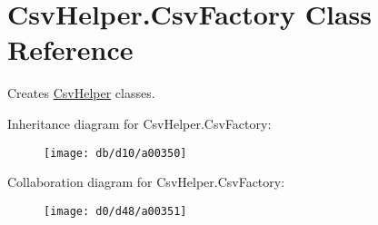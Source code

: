\hypertarget{a00045}{\section{Csv\-Helper.\-Csv\-Factory Class Reference}
\label{a00045}
}


Creates \hyperlink{a00284}{Csv\-Helper} classes.  




Inheritance diagram for Csv\-Helper.\-Csv\-Factory\-:
\nopagebreak
\begin{figure}[H]
\begin{center}
\leavevmode
\texttt{[image: db/d10/a00350]}
\end{center}
\end{figure}


Collaboration diagram for Csv\-Helper.\-Csv\-Factory\-:
\nopagebreak
\begin{figure}[H]
\begin{center}
\leavevmode
\texttt{[image: d0/d48/a00351]}
\end{center}
\end{figure}
